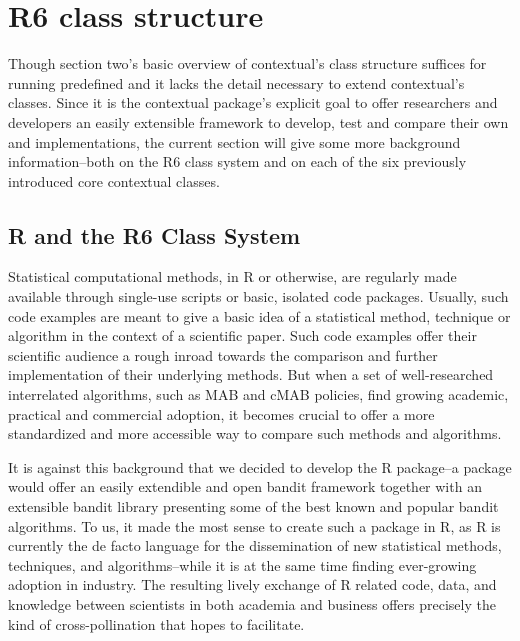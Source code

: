 \documentclass[nojss]{jss}\usepackage[]{graphicx}\usepackage[]{color}
\begin{document}

\section{R6 class structure}

Though section two's basic overview of contextual's  class structure suffices for running predefined  and  it lacks the detail necessary to extend contextual's classes. Since it is the contextual package's explicit goal to offer researchers and developers an easily extensible framework to develop, test and compare their own  and  implementations, the current section will give some more background information--both on the R6 class system and on each of the six previously introduced core contextual classes.

\subsection{R and the R6 Class System}

Statistical computational methods, in R or otherwise, are regularly made available through single-use scripts or basic, isolated code packages. Usually, such code examples are meant to give a basic idea of a statistical method, technique or algorithm in the context of a scientific paper.  Such code examples offer their scientific audience a rough inroad towards the comparison and further implementation of their underlying methods. But when a set of well-researched interrelated algorithms, such as MAB and cMAB policies, find growing academic, practical and commercial adoption, it becomes crucial to offer a more standardized and more accessible way to compare such methods and algorithms.

It is against this background that we decided to develop the  R package--a package would offer an easily extendible and open bandit framework together with an extensible bandit library presenting some of the best known and popular bandit algorithms. To us, it made the most sense to create such a package in R, as R is currently the de facto language for the dissemination of new statistical methods, techniques, and algorithms--while it is at the same time finding ever-growing adoption in industry. The resulting lively exchange of R related code, data, and knowledge between scientists in both academia and business offers precisely the kind of cross-pollination that  hopes to facilitate.
\end{document}
